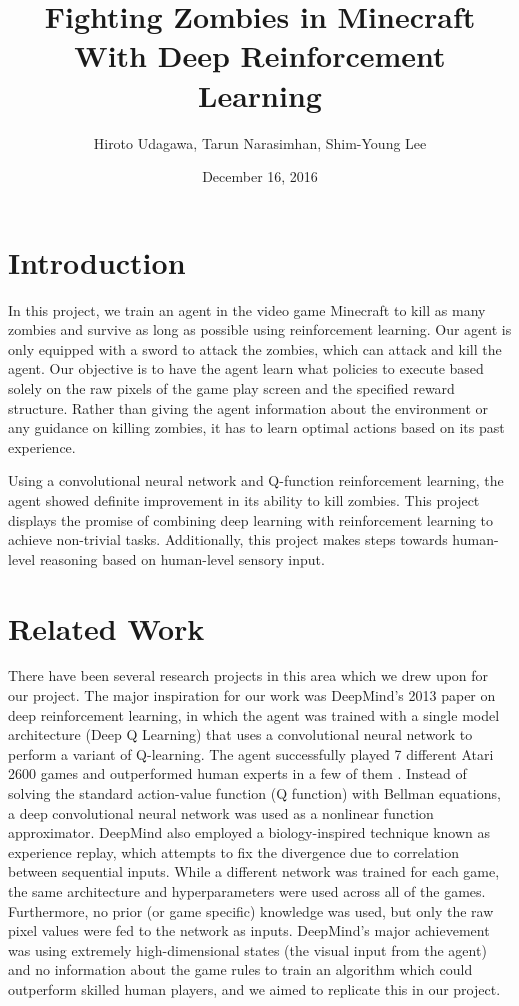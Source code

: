 \documentclass{article}
\title{Fighting Zombies in Minecraft With Deep Reinforcement Learning}
\author{Hiroto Udagawa, Tarun Narasimhan, Shim-Young Lee}
\date{December 16, 2016}
\begin{document}
\maketitle

\begin{multicols}{2}

\section{Introduction}

In this project, we train an agent in the video game Minecraft to kill as many zombies and survive as long as possible using reinforcement learning. Our agent is only equipped with a sword to attack the zombies, which can attack and kill the agent. Our objective is to have the agent learn what policies to execute based solely on the raw pixels of the game play screen and the specified reward structure. Rather than giving the agent information about the environment or any guidance on killing zombies, it has to learn optimal actions based on its past experience.

Using a convolutional neural network and Q-function reinforcement learning, the agent showed definite improvement in its ability to kill zombies. This project displays the promise of combining deep learning with reinforcement learning to achieve non-trivial tasks.
Additionally, this project makes steps towards human-level reasoning based on human-level sensory input.




\section{Related Work}

There have been several research projects in this area which we drew upon for our project.
The major inspiration for our work was DeepMind's 2013 paper on deep reinforcement learning, in which the agent was trained with a single model architecture (Deep Q Learning) that uses a convolutional neural network to perform a variant of Q-learning. The agent successfully played 7 different Atari 2600 games and outperformed human experts in a few of them \cite{deepMind}.
Instead of solving the standard action-value function (Q function) with Bellman equations, a deep convolutional neural network was used as a nonlinear function approximator. DeepMind also employed a biology-inspired technique known as experience replay, which attempts to fix the divergence due to correlation between sequential inputs.
While a different network was trained for each game, the same architecture and hyperparameters were used across all of the games.
Furthermore, no prior (or game specific) knowledge was used, but only the raw pixel values were fed to the network as inputs.
DeepMind's major achievement was using extremely high-dimensional states (the visual input from the agent) and no information about the game rules to train an algorithm which could outperform skilled human players, and we aimed to replicate this in our project.


\end{multicols}
\end{document}
